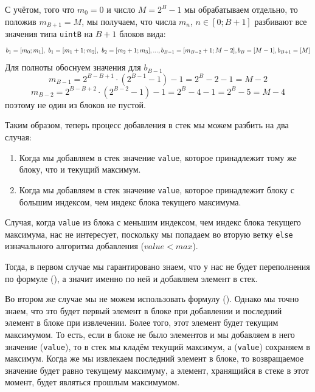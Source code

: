 С учётом, того что \(m_0 = 0\) и число \(M = 2^B - 1\) мы обрабатываем отдельно, то положив \(m_{B+1} = M\), мы получаем, что числа \(m_n\), \(n \in [0; B+1]\) разбивают все значения типа \texttt{uintB} на \(B+1\) блоков вида:
\begin{dmath*}
    b_1 = [m_{0}; m_{1}],\ b_1 =[m_{1}+1; m_{2}],\ b_2 = [m_2 + 1; m_3], ... ,\\
    b_{B-1}=[m_{B-2}+1;M-2] , b_{B}=[M-1] ,b_{B+1} = [M]
\end{dmath*}
Для полноты обоснуем значения для \(b_{B-1}\)
\begin{dmath*}
m_{B-1} 
    = 2^{B - B + 1}\cdot \left(2^{B-1} - 1\right) -1 
    = 2^B - 2 - 1 = M - 2 
\end{dmath*}
\begin{dmath*}
m_{B-2} 
    = 2^{B - B + 2}\cdot \left(2^{B-2} - 1\right) - 1
    = 2^B - 4 - 1 = 2^B - 5 = M - 4
\end{dmath*}
поэтому не один из блоков не пустой.
    
Таким образом, теперь процесс добавления в стек мы можем разбить на два случая:
\begin{enumerate}
    \item Когда мы добавляем в стек значение \texttt{value}, которое принадлежит тому же блоку, что и текущий максимум.
    \item Когда мы добавляем в стек значение \texttt{value}, которое принадлежит блоку с большим индексом, чем индекс блока текущего максимума.
\end{enumerate}

Случая, когда \texttt{value} из блока с меньшим индексом, чем индекс блока текущего максимума, нас не интересует, поскольку мы попадаем во вторую ветку \texttt{else} изначального алгоритма добавления (\(value < max\)). 

Тогда, в первом случае мы гарантировано знаем, что у нас не будет переполнения по формуле (), а значит именно по ней и добавляем элемент в стек.

Во втором же случае мы не можем использовать формулу (). Однако мы точно знаем, что это будет первый элемент в блоке при добавлении и последний элемент в блоке при извлечении. Более того, этот элемент будет текущим максимумом. То есть, если в блоке не было элементов и мы добавляем в него значение (\texttt{value}), то в стек мы кладём текущий максимум, а (\texttt{value}) сохраняем в максимум. Когда же мы извлекаем последний элемент в блоке, то возвращаемое значение будет равно текущему максимуму, а элемент, хранящийся в стеке в этот момент, будет являться прошлым максимумом. 


